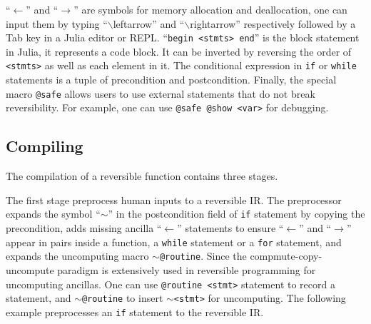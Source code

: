 \documentclass[aps,twocolumn,longbibliography,english,superscriptaddress]{revtex4-1}
\newcommand{\<}{\langle}
\renewcommand{\>}{\rangle}
\theoremstyle{definition}\newtheorem{definition}{\textit{Definition}}
\begin{document}
``\texttt{$\leftarrow$}'' and ``\texttt{$\rightarrow$}'' are symbols for memory allocation and deallocation, one can input them by typing ``$\backslash$leftarrow'' and ``$\backslash$rightarrow'' respectively followed by a Tab key in a Julia editor or REPL.
``\texttt{begin <stmts> end}'' is the block statement in Julia, it represents a code block.
It can be inverted by reversing the order of \texttt{<stmts>} as well as each element in it.
The conditional expression in \texttt{if} or \texttt{while} statements is a tuple of precondition and postcondition.
Finally, the special macro \texttt{@safe} allows users to use external statements that do not break reversibility.
For example, one can use \texttt{@safe @show <var>} for debugging.

\subsection{Compiling}
The compilation of a reversible function contains three stages.

The first stage preprocess human inputs to a reversible IR.
The preprocessor expands the symbol ``\texttt{$\sim$}'' in the postcondition field of \texttt{if} statement by copying the precondition, adds missing ancilla ``$\leftarrow$'' statements to ensure ``\texttt{$\leftarrow$}'' and ``\texttt{$\rightarrow$}'' appear in pairs inside a function, a \texttt{while} statement or a \texttt{for} statement, and expands the uncomputing macro \texttt{$\sim$@routine}.
Since the compmute-copy-uncompute paradigm is extensively used in reversible programming for uncomputing ancillas.
One can use \texttt{@routine <stmt>} statement to record a statement, and \texttt{$\sim$@routine} to insert \texttt{$\sim$<stmt>} for uncomputing. 
The following example preprocesses an \texttt{if} statement to the reversible IR.
\end{document}

